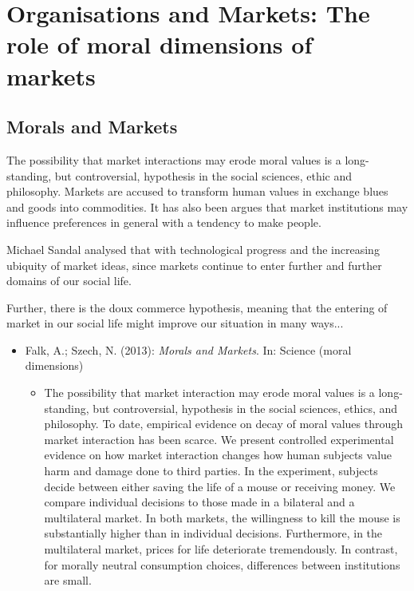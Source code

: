 
\chapter{Organisations and Markets: The role of moral dimensions of markets}


\section{Morals and Markets}

The possibility that market interactions may erode moral values is a long-standing, but controversial, hypothesis in the social sciences, ethic and philosophy. Markets are accused to transform human values in exchange blues and goods into commodities. It has also been argues that market institutions may influence preferences in general with a tendency to make people.

Michael Sandal analysed that with technological progress and the increasing ubiquity of market ideas, since markets continue to enter further and further domains of our social life.


Further, there is the doux commerce hypothesis, meaning that the entering of market in our social life might improve our situation in many ways...

\begin{itemize}
	\item Falk, A.; Szech, N. (2013): \textit{Morals and Markets}. In: Science (moral dimensions)
		\begin{itemize}
			\item The possibility that market interaction may erode moral values is a long-standing, but controversial, hypothesis in the social sciences, ethics, and philosophy. To date, empirical evidence on decay of moral values through market interaction has been scarce. We present controlled experimental evidence on how market interaction changes how human subjects value harm and damage done to third parties. In the experiment, subjects decide between either saving the life of a mouse or receiving money. We compare individual decisions to those made in a bilateral and a multilateral market. In both markets, the willingness to kill the mouse is substantially higher than in individual decisions. Furthermore, in the multilateral market, prices for life deteriorate tremendously. In contrast, for morally neutral consumption choices, differences between institutions are small.
		\end{itemize}
\end{itemize}


